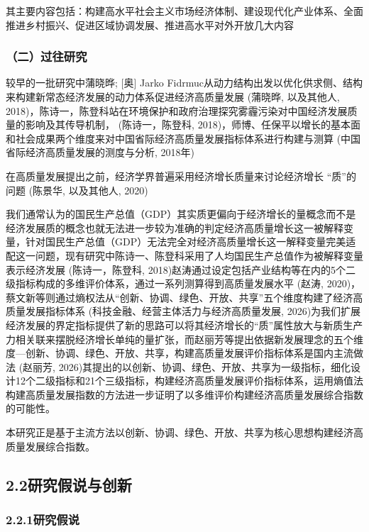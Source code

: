 \documentclass[UTF8,a4paper,12pt,fontset=windows]{ctexart}
\begin{document}
其主要内容包括：构建高水平社会主义市场经济体制、建设现代化产业体系、全面推进乡村振兴、促进区域协调发展、推进高水平对外开放几大内容

\subsubsection{（二）过往研究}\label{ux4e8cux8fc7ux5f80ux7814ux7a76}

较早的一批研究中蒲晓晔; {[}奥{]} Jarko Fidrmuc从动力结构出发以优化供求侧、结构来构建新常态经济发展的动力体系促进经济高质量发展 (蒲晓晔, 以及其他人, 2018)，陈诗一，陈登科站在环境保护和政府治理探究雾霾污染对中国经济发展质量的影响及其传导机制， (陈诗一，陈登科, 2018)，师博、任保平以增长的基本面和社会成果两个维度来对中国省际经济高质量发展指标体系进行构建与测算 (中国省际经济高质量发展的测度与分析, 2018年)

在高质量发展提出之前，经济学界普遍采用经济增长质量来讨论经济增长 ``质''的问题 (陈景华, 以及其他人, 2020)

我们通常认为的国民生产总值（GDP）其实质更偏向于经济增长的量概念而不是经济发展质的概念也就无法进一步较为准确的判定经济高质量增长这一被解释变量，针对国民生产总值（GDP）无法完全对经济高质量增长这一解释变量完美适配这一问题，现有研究中陈诗一、陈登科采用了人均国民生产总值作为被解释变量表示经济发展 (陈诗一，陈登科, 2018)赵涛通过设定包括产业结构等在内的5个二级指标构成的多维评价体系，通过一系列测算得到高质量发展水平 (赵涛, 2020)，蔡文新等则通过熵权法从``创新、协调、绿色、开放、共享''五个维度构建了经济高质量发展指标体系 (科技金融、经营主体活力与经济高质量发展, 2026)为我们扩展经济发展的界定指标提供了新的思路可以将其经济增长的``质''属性放大与新质生产力相关联来摆脱经济增长单纯的量扩张，而赵丽芳等提出依据新发展理念的五个维度---创新、协调、绿色、开放、共享，构建高质量发展评价指标体系是国内主流做法 (赵丽芳, 2026)其提出的以创新、协调、绿色、开放、共享为一级指标，细化设计12个二级指标和21个三级指标，构建经济高质量发展评价指标体系，运用熵值法构建高质量发展指数的方法进一步证明了以多维评价构建经济高质量发展综合指数的可能性。

本研究正是基于主流方法以创新、协调、绿色、开放、共享为核心思想构建经济高质量发展综合指数。

\subsection{2.2研究假说与创新}\label{ux7814ux7a76ux5047ux8bf4ux4e0eux521bux65b0}

\subsubsection{2.2.1研究假说}\label{ux7814ux7a76ux5047ux8bf4}
\end{document}
